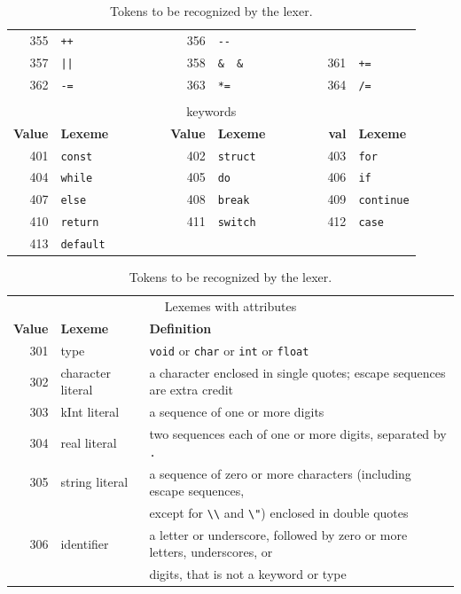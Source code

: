 \documentclass{report}
\newcommand{\+}{}
\begin{document}
\begin{table}[t]
\begin{tabular}{rlcrlcrl}
            355 & \verb|++| & &
            356 & \verb|--| \\
            357 & \verb+||+ & &
            358 & \verb|&  &  | & &
            361 & \verb|+=| \\
            362 & \verb|-=| & &
            363 & \verb|*=| & &
            364 & \verb|/=| \\
            \\
            \multicolumn{8}{c}{keywords}
            \\[1mm]
            {\bf Value} & {\bf Lexeme}
            & ~~~~~~ &
                {\bf Value} & {\bf Lexeme}
            & ~~~~~~ &
                {\bf val} & {\bf Lexeme}
            \\ \cline{1-2} \cline{4-5} \cline{7-8}
            401 & \verb|const| & &
            402 & \verb|struct| & &
            403 & \verb|for| \\
            404 & \verb|while| & &
            405 & \verb|do| & &
            406 & \verb|if| \\
            407 & \verb|else| & &
            408 & \verb|break| & &
            409 & \verb|continue| \\
            410 & \verb|return| & &
            411 & \verb|switch| & &
            412 & \verb|case| \\
            413 & \verb|default| \\
        \end{tabular}

        \begin{tabular}{rll}
            \\
            \multicolumn{3}{c}{Lexemes with attributes}
            \\[1mm]
            {\bf Value} & {\bf Lexeme} & {\bf Definition}
            \\ \hline
            301 & type & \verb|void| or \verb|char| or \verb|int| or \verb|float|
            \\
            302 & character literal & a character enclosed in single quotes;
            escape sequences are extra credit
            \\
            303 & kInt literal & a sequence of one or more digits
            \\
            304 & real literal & two sequences each of one or more digits, separated by \verb|.|
            \\
            305 & string literal & a sequence of zero or more characters (including escape sequences,
            \\ & & except for \verb|\\| and \verb|\"|) enclosed in double quotes
            \\
            306 & identifier & a letter or underscore, followed by zero or more letters,
            underscores, or
            \\ & & digits, that is not a keyword or type
        \end{tabular}

        \caption{Tokens to be recognized by the lexer.}
        \label{tab:tokens}
    \end{table}
\end{document}
